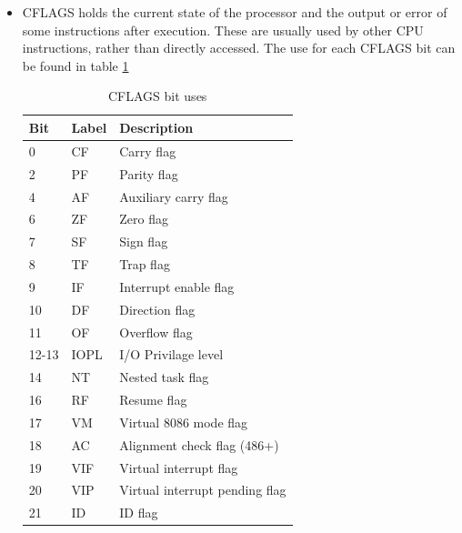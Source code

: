 \begin{itemize}
\begin{itemize}
						\end{itemize}
					\item CFLAGS holds the current state of the processor and the output or error of some instructions after execution. 
						These are usually used by other CPU instructions, rather than directly accessed.
						The use for each CFLAGS bit can be found in table \ref{tab:CFLAGSBits} 
						\begin{table}[htb]
							\centering
				\begin{adjustbox}{max width=1\textwidth}
							\begin{tabular}{| l | l | l |}
								\hline
								\textbf{Bit} &  \textbf{Label} &   \textbf{Description} \\\hline
								0   &   CF &     Carry flag \\ \hline
								2   &   PF   &   Parity flag \\ \hline
								4   &   AF   &   Auxiliary carry flag \\ \hline
								6   &   ZF   &   Zero flag \\ \hline
								7   &   SF   &   Sign flag \\ \hline
								8   &   TF   &   Trap flag \\ \hline
								9   &   IF   &   Interrupt enable flag \\ \hline
								10  &   DF   &   Direction flag \\ \hline
								11  &   OF   &   Overflow flag \\ \hline
								12-13 & IOPL &   I/O Privilage level \\ \hline
								14  &   NT   &   Nested task flag \\ \hline
								16  &   RF   &   Resume flag \\ \hline
								17  &   VM   &   Virtual 8086 mode flag \\ \hline
								18  &   AC   &   Alignment check flag (486+) \\ \hline
								19  &   VIF  &   Virtual interrupt flag \\ \hline
								20  &   VIP  &   Virtual interrupt pending flag \\ \hline
								21  &   ID   &   ID flag \\ \hline
						\end{tabular}
					\end{adjustbox}
						\caption{CFLAGS bit uses}
						\label{tab:CFLAGSBits}
					\end{table}
				\end{itemize}
				
